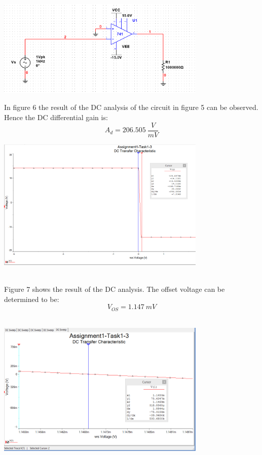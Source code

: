\documentclass[11pt,a4paper]{article}
\begin{document}
\begin{enumerate}
      \begin{minipage}{\linewidth}
      \centering
      \includegraphics[width=10cm]{Task1-3-Circuit}\\
    \end{minipage}
    
In figure 6 the result of the DC analysis of the circuit in figure 5 can be observed. Hence the DC differential gain is:
$$A_{d} = 206.505\ \frac{V}{mV} $$    
    
    
        \begin{minipage}{\linewidth}
      \centering
      \includegraphics[width=10cm]{Task1-3-DCAnalysis}\\
    \end{minipage}\\   
    
Figure 7 shows the result of the DC analysis. The offset voltage can be determined to be:
$$ V_{OS} = 1.147\ mV $$\\
    
    
\begin{minipage}{\linewidth}
  \centering
    \includegraphics[width=10cm]{Task1-3-Vos}\\
    \end{minipage}\\
    

\end{enumerate}
\end{document}
